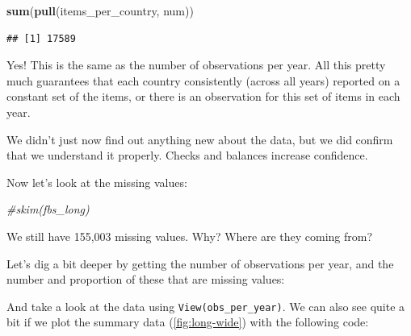\documentclass[]{book}
\newenvironment{Shaded}{\begin{snugshade}}{\end{snugshade}}
\newcommand{\CommentTok}[1]{\textcolor[rgb]{0.56,0.35,0.01}{\textit{#1}}}
\newcommand{\DataTypeTok}[1]{\textcolor[rgb]{0.13,0.29,0.53}{#1}}
\newcommand{\KeywordTok}[1]{\textcolor[rgb]{0.13,0.29,0.53}{\textbf{#1}}}
\newcommand{\NormalTok}[1]{#1}
\newcommand{\OperatorTok}[1]{\textcolor[rgb]{0.81,0.36,0.00}{\textbf{#1}}}
\newcommand{\StringTok}[1]{\textcolor[rgb]{0.31,0.60,0.02}{#1}}
\begin{document}
\begin{Shaded}
\begin{Highlighting}[]
\KeywordTok{sum}\NormalTok{(}\KeywordTok{pull}\NormalTok{(items_per_country, num))}
\end{Highlighting}
\end{Shaded}

\begin{verbatim}
## [1] 17589
\end{verbatim}

Yes! This is the same as the number of observations per year. All this pretty much guarantees that each country consistently (across all years) reported on a constant set of the items, or there is an observation for this set of items in each year.

\begin{safety}
We didn't just now find out anything new about the data, but we did
confirm that we understand it properly. Checks and balances increase
confidence.
\end{safety}

Now let's look at the missing values:

\begin{Shaded}
\begin{Highlighting}[]
\CommentTok{#skim(fbs_long)}
\end{Highlighting}
\end{Shaded}

We still have 155,003 missing values. Why? Where are they coming from?

Let's dig a bit deeper by getting the number of observations per year, and the number and proportion of these that are missing values:

\begin{Shaded}
\end{Shaded}

And take a look at the data using \texttt{View(obs\_per\_year)}. We can also see quite a bit if we plot the summary data (\ref{fig:long-wide}) with the following code:
\end{document}
